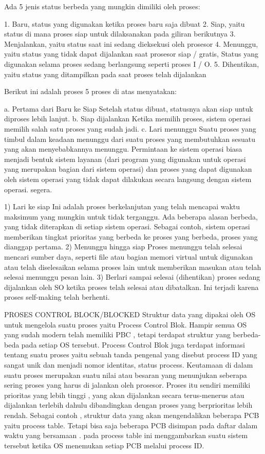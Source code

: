 Ada 5 jenis status berbeda yang mungkin dimiliki oleh proses:

1. Baru, status yang digunakan ketika proses baru saja dibuat
2. Siap, yaitu status di mana proses siap untuk dilaksanakan pada giliran berikutnya
3. Menjalankan, yaitu status saat ini sedang dieksekusi oleh prosesor
4. Menunggu, yaitu status yang tidak dapat dijalankan saat prosesor siap / gratis, Status yang digunakan selama proses sedang berlangsung seperti proses I / O.
5. Dihentikan, yaitu status yang ditampilkan pada saat proses telah dijalankan

Berikut ini adalah proses 5 proses di atas menyatakan:

	a. Pertama dari Baru ke Siap
		Setelah status dibuat, statusnya akan siap untuk diproses lebih lanjut.
	b. Siap dijalankan
		Ketika memilih proses, sistem operasi memilih salah satu proses yang sudah jadi.
	c. Lari menunggu
		Suatu proses yang timbul dalam keadaan menunggu dari suatu proses yang membutuhkan sesuatu yang akan menyebabkannya menunggu. Permintaan ke sistem operasi biasa menjadi bentuk sistem layanan (dari program yang digunakan untuk operasi yang merupakan bagian dari sistem operasi) dan proses yang dapat digunakan oleh sistem operasi yang tidak dapat dilakukan secara langsung dengan sistem operasi. segera.

1) Lari ke siap
	Ini adalah proses berkelanjutan yang telah mencapai waktu maksimum yang mungkin untuk tidak terganggu. Ada beberapa alasan berbeda, yang tidak diterapkan di setiap sistem operasi. Sebagai contoh, sistem operasi memberikan tingkat prioritas yang berbeda ke proses yang berbeda, proses yang dianggap pertama.
2) Menunggu hingga siap
	Proses menunggu telah selesai mencari sumber daya, seperti file atau bagian memori virtual untuk digunakan atau telah diselesaikan selama proses lain untuk memberikan masukan atau telah selesai menunggu pesan lain.
3) Berlari sampai selesai (dihentikan)
	proses sedang dijalankan oleh SO ketika proses telah selesai atau dibatalkan. Ini terjadi karena proses self-making telah berhenti.

	PROSES CONTROL BLOCK/BLOCKED
	Struktur data yang dipakai oleh OS untuk mengelola suatu proses yaitu Process Control Blok. Hampir semua OS yang sudah modern telah memiliki PBC , tetapi terdapat struktur yang berbeda-beda pada setiap OS tersebut. Process Control Blok juga terdapat informasi tentang suatu proses yaitu sebuah tanda pengenal yang disebut process ID yang sangat unik dan menjadi nomor identitas, status process. Keutamaan di dalam suatu proses merupakan suatu nilai atau besaran yang menunjukan seberapa sering proses yang harus di jalankan oleh prosesor. Proses itu sendiri memiliki prioritas yang lebih tinggi , yang akan dijalankan secara terus-menerus atau dijalankan terlebih dahulu dibandingkan dengan proses yang berprioritas lebih rendah. Sebagai contoh , struktur data yang akan mengendalikan beberapa PCB yaitu process table. Tetapi bisa saja beberapa PCB disimpan pada daftar dalam waktu yang bersamaan . pada process table ini menggambarkan suatu sistem tersebut ketika OS menemukan setiap PCB melalui process ID.


